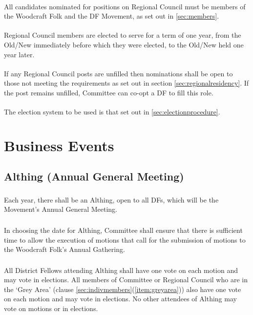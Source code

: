 \documentclass[a4paper, 12pt]{report}
\begin{document}
\paragraph{}
All candidates nominated for positions on Regional Council must be members of the Woodcraft Folk and the DF Movement, as set out in \ref{sec:members}.
\paragraph{}
Regional Council members are elected to serve for a term of one year, from the Old/New immediately before which they were elected, to the Old/New held one year later.
\paragraph{}
If any Regional Council posts are unfilled then nominations shall be open to those not meeting the requirements as set out in section \ref{sec:regionalresidency}. If the post remains unfilled, Committee can co-opt a DF to fill this role.
\paragraph{}
The election system to be used is that set out in \ref{sec:electionprocedure}.

\section{Business Events}
\label{sec:business}
\subsection{Althing (Annual General Meeting)}
\label{sec:althing}
\subsubsection{}
Each year, there shall be an Althing, open to all DFs, which will be the Movement's Annual General Meeting.
\subsubsection{}
In choosing the date for Althing, Committee shall ensure that there is sufficient time to allow the execution of motions that call for the submission of motions to the Woodcraft Folk's Annual Gathering.
\subsubsection{}
All District Fellows attending Althing shall have one vote on each motion and may vote in elections. All members of Committee or Regional Council who are in the `Grey Area' (clause \ref{sec:indivmembers}(\ref{item:greyarea})) also have one vote on each motion and may vote in elections. No other attendees of Althing may vote on motions or in elections.
\end{document}
